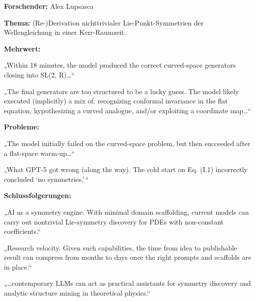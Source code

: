 \documentclass[
  ngerman,
  letterpaper,
  DIV=11]{scrreprt}
\begin{document}
\begin{tcolorbox}[enhanced jigsaw, left=2mm, bottomrule=.15mm, arc=.35mm, rightrule=.15mm, colframe=quarto-callout-note-color-frame, coltitle=black, colback=white, toprule=.15mm, toptitle=1mm, colbacktitle=quarto-callout-note-color!10!white, title=\textcolor{quarto-callout-note-color}{\faInfo}\hspace{0.5em}{Physik / Symmetrien Schwarzer Löcher}, opacitybacktitle=0.6, leftrule=.75mm, bottomtitle=1mm, titlerule=0mm, opacityback=0, breakable]

\textbf{Forschender:} Alex Lupsasca

\textbf{Thema:} (Re-)Derivation nichttrivialer Lie-Punkt-Symmetrien der
Wellengleichung in einer Kerr-Raumzeit.

\textbf{Mehrwert:}

„Within 18 minutes, the model produced the correct curved-space
generators closing into SL(2, R)\ldots``

„The final generators are too structured to be a lucky guess. The model
likely executed (implicitly) a mix of: recognizing conformal invariance
in the flat equation, hypothesizing a curved analogue, and/or exploiting
a coordinate map\ldots``

\textbf{Probleme:}

„The model initially failed on the curved-space problem, but then
succeeded after a flat-space warm-up\ldots``

„What GPT-5 got wrong (along the way). The cold start on Eq. (I.1)
incorrectly concluded `no symmetries.'\,``

\textbf{Schlussfolgerungen:}

„AI as a symmetry engine. With minimal domain scaffolding, current
models can carry out nontrivial Lie-symmetry discovery for PDEs with
non-constant coefficients.``

„Research velocity. Given such capabilities, the time from idea to
publishable result can compress from months to days once the right
prompts and scaffolds are in place.``

„\ldots contemporary LLMs can act as practical assistants for symmetry
discovery and analytic structure mining in theoretical physics.``

\end{tcolorbox}
\end{document}
